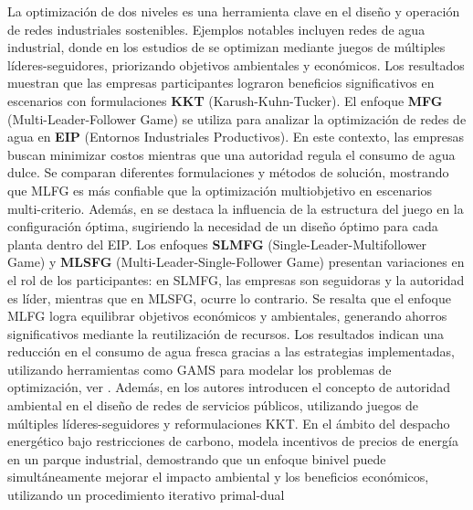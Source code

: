 La optimización de dos niveles es una herramienta clave en el diseño y operación de redes industriales sostenibles. Ejemplos notables incluyen redes de agua industrial, 
donde en los estudios de \cite{Ramos2016WaterII} se optimizan mediante juegos de múltiples líderes-seguidores, priorizando objetivos ambientales y económicos. Los resultados muestran que las empresas participantes lograron beneficios significativos en escenarios con formulaciones \textbf{KKT} (Karush-Kuhn-Tucker). 
El enfoque \textbf{MFG} (Multi-Leader-Follower Game) se utiliza para analizar la optimización de redes de agua en \textbf{EIP} (Entornos Industriales Productivos). En este contexto, las empresas buscan minimizar costos mientras que una autoridad regula el consumo de agua dulce. Se comparan diferentes formulaciones y métodos de solución, mostrando que MLFG es más confiable que la optimización multiobjetivo en escenarios multi-criterio. Además, en \cite{Ramos2016WaterII} se destaca la influencia de la estructura del juego en la configuración óptima, sugiriendo la necesidad de un diseño óptimo para cada planta dentro del EIP. 
Los enfoques \textbf{SLMFG} (Single-Leader-Multifollower Game) y \textbf{MLSFG} (Multi-Leader-Single-Follower Game) presentan variaciones en el rol de los participantes: en SLMFG, las empresas son seguidoras y la autoridad es líder, mientras que en MLSFG, ocurre lo contrario. Se resalta que el enfoque MLFG logra equilibrar objetivos económicos y ambientales, generando ahorros significativos mediante la reutilización de recursos. Los resultados indican una reducción en el consumo de agua fresca gracias a las estrategias implementadas, utilizando herramientas como GAMS para modelar los problemas de optimización, ver \cite{Ramos2016WaterII}. 
Además, en \cite{Ramos2018UtilityNO} los autores introducen el concepto de autoridad ambiental en el diseño de redes de servicios públicos, utilizando juegos de múltiples líderes-seguidores y reformulaciones KKT. 
En el ámbito del despacho energético bajo restricciones de carbono, \cite{Gu2020BilevelOL} modela incentivos de precios de energía en un parque industrial, demostrando que un enfoque binivel puede simultáneamente mejorar el impacto ambiental y los beneficios económicos, utilizando un procedimiento iterativo primal-dual

